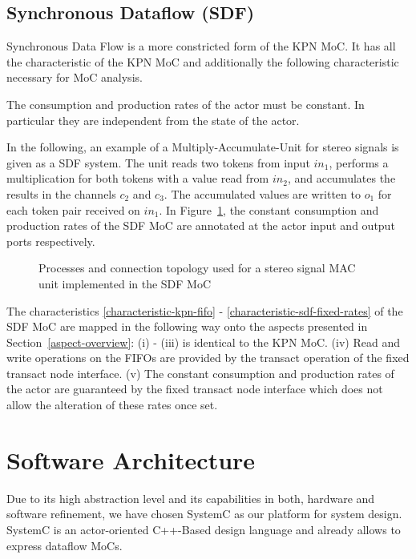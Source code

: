 \subsection{Synchronous Dataflow (SDF)}
Synchronous Data Flow \cite{Lee87b:1987} is a more constricted form of the
KPN MoC. It has all the characteristic of the KPN MoC and additionally the
following characteristic necessary for MoC analysis.

\begin{characteristic}\label{characteristic-sdf-fixed-rates}
The consumption and production rates of the actor must be constant.
In particular they are independent from the state of the actor.
\end{characteristic}

In the following, an example of a Multiply-Accumulate-Unit for stereo signals is given
as a SDF system. The unit reads two tokens from input $in_1$,
performs a multiplication for both tokens with a value read from $in_2$,
and accumulates the results in the channels $c_2$ and
$c_3$. The accumulated values are written to $o_1$ for each
token pair received on $in_1$.
In Figure~\ref{fig:sdf-mac-unit},
the constant consumption and production rates of the SDF
MoC are annotated at the actor input and output ports
respectively.

\begin{figure}[h]
\centering

\caption{Processes and connection topology used for a stereo signal MAC
  unit implemented in the SDF MoC}
\label{fig:sdf-mac-unit}
\end{figure}

The characteristics \ref{characteristic-kpn-fifo} -
\ref{characteristic-sdf-fixed-rates} of the SDF MoC are mapped in the following way
onto the aspects presented in Section~\ref{aspect-overview}: (i) - (iii) is identical
to the KPN MoC.
(iv) Read and write operations on the FIFOs are provided by the transact
operation of the fixed transact node interface.
(v) The constant consumption and production rates of the actor are
guaranteed by the fixed transact node interface which does
not allow the alteration of these rates once set.

\section{Software Architecture}\label{software-architecture}

Due to its high abstraction level and its capabilities in both,
hardware and software refinement, we have chosen SystemC
\cite{systemc-lrm:2003,glms:2002} as our platform for system design.
SystemC is an actor-oriented C++-Based design language and
already allows to express dataflow MoCs.

